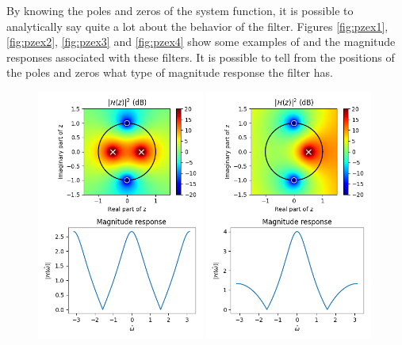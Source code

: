 By knowing the poles and zeros of the system function, it is possible
to analytically say quite a lot about the behavior of the
filter. Figures \ref{fig:pzex1}, \ref{fig:pzex2}, \ref{fig:pzex3}
and \ref{fig:pzex4} show some examples of  and the magnitude responses associated
with these filters. It is possible to tell from the positions of the
poles and zeros what type of magnitude response the filter has.

\begin{figure}
\begin{center}
\includegraphics[width=0.49\textwidth]{code/026_iir/ex1.png}
\includegraphics[width=0.49\textwidth]{code/026_iir/ex2.png}

\end{center}
\end{figure}
